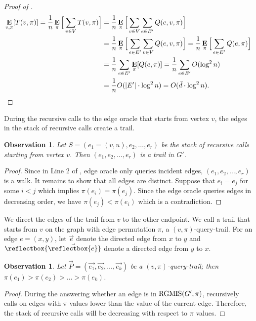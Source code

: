 \documentclass[letterpaper,11pt]{article}
\DeclareMathOperator{\E}{\ensuremath{\normalfont \textbf{E}}}
\newcommand{\RGMIS}[0]{\ensuremath{\textup{RGMIS}}}
\newcommand{\cev}[1]{\reflectbox{\ensuremath{\vec{\reflectbox{\ensuremath{#1}}}}}}
\newtheorem{observation}[theorem]{Observation}
\newenvironment{myproof}{
\vspace{-0.5cm}
\begin{proof}
}{
\end{proof}
}
\begin{document}
\begin{myproof}[Proof of ]
\begin{align*}
    \E_{v, \pi}[T(v, \pi)] = \frac{1}{n}\E_\pi\Big[\sum_{v\in V}T(v,\pi)\Big] & = \frac{1}{n}\E_\pi\Big[\sum_{v\in V}\sum_{e \in E'}Q(e,v,\pi)\Big] \\
    & = \frac{1}{n}\E_\pi\Big[\sum_{e \in E'}\sum_{v\in V}Q(e,v,\pi)\Big] = \frac{1}{n} \E_\pi\Big[\sum_{e \in E'} Q(e, \pi)\Big] \\ 
    & = \frac{1}{n} \sum_{e \in E'} \E_\pi[ Q(e, \pi)] = \frac{1}{n} \sum_{e \in E'} O(\log^2 n) \\
    & = \frac{1}{n} O(|E'|\cdot \log^2 n) = O(\bar{d}\cdot \log^2 n).\qedhere
\end{align*}
\end{myproof}

During the recursive calls to the edge oracle that starts from vertex $v$, the edges in the stack of recursive calls create a trail. 

\begin{observation}
Let $S = (e_1 = (v, u), e_2, \ldots, e_r)$ be the stack of recursive calls starting from vertex $v$. Then $(e_1, e_2, \ldots, e_r)$ is a trail in $G'$.
\end{observation}
\begin{myproof}
Since in Line 2 of , edge oracle only queries incident edges, $(e_1, e_2, \ldots, e_r)$ is a walk. It remains to show that all edges are distinct. Suppose that $e_i = e_j$ for some $i < j$ which implies $\pi(e_i) = \pi(e_j)$. Since the edge oracle queries edges in decreasing order, we have $\pi(e_j) < \pi(e_i)$ which is a contradiction. 
\end{myproof}


We direct the edges of the trail from $v$ to the other endpoint. We call a trail that starts from $v$ on the graph with edge permutation $\pi$, a $(v,\pi)$-query-trail. For an edge $e = (x,y)$, let $\vec{e}$ denote the directed edge from $x$ to $y$ and $\cev{e}$ denote a directed edge from $y$ to $x$. 

\begin{observation}\label{obs:increasing_trail}
Let $\vec{P} = (\vec{e_1}, \vec{e_2}, \ldots, \vec{e_k})$ be a $(v, \pi)$-query-trail; then $\pi(e_1) > \pi(e_2) > \ldots > \pi(e_k)$.
\end{observation}
\begin{myproof}
During the answering whether an edge is in $\RGMIS(G',\pi)$,  recursively calls on edges with 
$\pi$ values lower than the value of the current edge. Therefore, the stack of recursive calls will be decreasing with respect to $\pi$ values.
\end{myproof}
\end{document}
